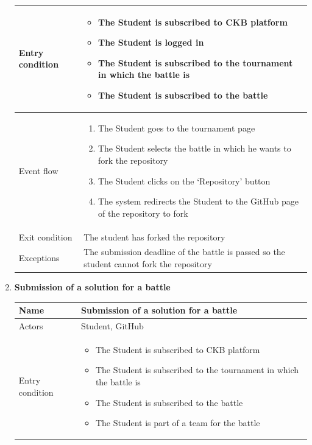 \begin{enumerate}[label=UC\arabic*:]
\begin{tabular}{|p{3cm}|p{8cm}|}
        \hline
        Entry condition &
        \begin{itemize}
            \item The Student is subscribed to CKB platform
            \item The Student is logged in
            \item The Student is subscribed to the tournament in which the battle is
            \item The Student is subscribed to the battle
        \end{itemize} \\
        \hline
        Event flow &
        \begin{enumerate}[label=\arabic*.]
            \item The Student goes to the tournament page
            \item The Student selects the battle in which he wants to fork the repository
            \item The Student clicks on the `Repository' button
            \item The system redirects the Student to the GitHub page of the repository to fork
        \end{enumerate} \\
        \hline
        Exit condition & The student has forked the repository \\
        \hline
        Exceptions & The submission deadline of the battle is passed so the student cannot fork the repository \\
        \hline
    \end{tabular}
    \item \textbf{Submission of a solution for a battle} \\
    \begin{tabular}{|p{3cm}|p{8cm}|}
        \hline
        Name & Submission of a solution for a battle \\
        \hline
        Actors & Student, GitHub \\
        \hline
        Entry condition &
        \begin{itemize}
            \item The Student is subscribed to CKB platform
            \item The Student is subscribed to the tournament in which the battle is
            \item The Student is subscribed to the battle
            \item The Student is part of a team for the battle

\end{itemize}
\end{tabular}
\end{enumerate}

